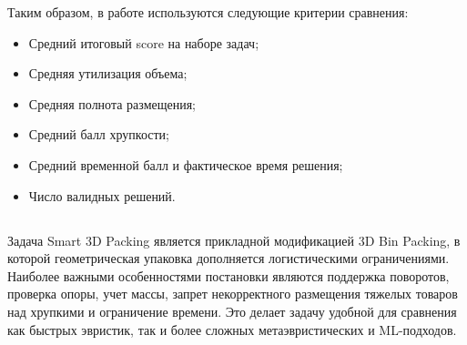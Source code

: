 Таким образом, в работе используются следующие критерии сравнения:
\begin{itemize}
  \item Средний итоговый score на наборе задач;
  \item Средняя утилизация объема;
  \item Средняя полнота размещения;
  \item Средний балл хрупкости;
  \item Средний временной балл и фактическое время решения;
  \item Число валидных решений.
\end{itemize}

\subsection{}

Задача Smart 3D Packing является прикладной модификацией 3D Bin Packing, в которой геометрическая упаковка дополняется логистическими ограничениями. Наиболее важными особенностями постановки являются поддержка поворотов, проверка опоры, учет массы, запрет некорректного размещения тяжелых товаров над хрупкими и ограничение времени. Это делает задачу удобной для сравнения как быстрых эвристик, так и более сложных метаэвристических и ML-подходов.
